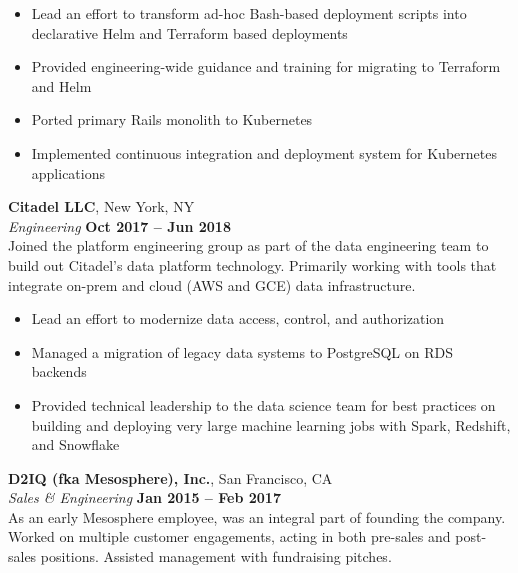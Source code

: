 \documentclass[margin,line]{resume}
\begin{document}
\begin{resume}
    \begin{itemize}
        \item Lead an effort to transform ad-hoc Bash-based deployment scripts
        into declarative Helm and Terraform based deployments
        \item Provided engineering-wide guidance and training for migrating to
        Terraform and Helm
        \item Ported primary Rails monolith to Kubernetes
        \item Implemented continuous integration and deployment system for
        Kubernetes applications
    \end{itemize}

    \textbf{Citadel LLC}, New York, NY \vspace{2mm}\\\vspace{1mm}%
    \textsl{Engineering} \hfill \textbf{Oct 2017 -- Jun 2018}\\
    Joined the platform engineering group as part of the data engineering
    team to build out Citadel's data platform technology. Primarily working
    with tools that integrate on-prem and cloud (AWS and GCE) data
    infrastructure.

    \begin{itemize}
        \item Lead an effort to modernize data access, control, and
        authorization
        \item Managed a migration of legacy data systems to PostgreSQL on RDS
        backends
        \item Provided technical leadership to the data science team for best
        practices on building and deploying very large machine learning jobs
        with Spark, Redshift, and Snowflake
    \end{itemize}

    \textbf{D2IQ (fka Mesosphere), Inc.}, San Francisco, CA \vspace{2mm}\\\vspace{1mm}%
    \textsl{Sales \& Engineering} \hfill \textbf{Jan 2015 -- Feb 2017}\\
    As an early Mesosphere employee, was an integral part of founding the
    company.  Worked on multiple customer engagements, acting in both pre-sales
    and post-sales positions. Assisted management with fundraising pitches.


\end{resume}
\end{document}
